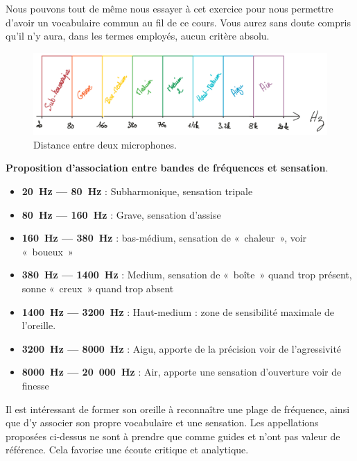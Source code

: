 \documentclass[
]{book}
\providecommand{\tightlist}{%
  \setlength{\itemsep}{0pt}\setlength{\parskip}{0pt}}
\begin{document}
Nous pouvons tout de même nous essayer à cet exercice pour nous permettre d'avoir un vocabulaire commun au fil de ce cours. Vous aurez sans doute compris qu'il n'y aura, dans les termes employés, aucun critère absolu.

\begin{figure}

{\centering \includegraphics[width=1\linewidth]{_resources/drawings/spectre} 

}

\caption{Distance entre deux microphones.}\label{fig:unnamed-chunk-6}
\end{figure}

\textbf{Proposition d'association entre bandes de fréquences et sensation}.

\begin{itemize}
\tightlist
\item
  \textbf{20~Hz --- 80~Hz} : Subharmonique, sensation tripale
\item
  \textbf{80~Hz --- 160~Hz} : Grave, sensation d'assise
\item
  \textbf{160~Hz --- 380~Hz} : bas-médium, sensation de «~chaleur~», voir «~boueux~»
\item
  \textbf{380~Hz --- 1400~Hz} : Medium, sensation de «~boîte~» quand trop présent, sonne «~creux~» quand trop absent
\item
  \textbf{1400~Hz --- 3200~Hz} : Haut-medium : zone de sensibilité maximale de l'oreille.
\item
  \textbf{3200~Hz --- 8000~Hz} : Aigu, apporte de la précision voir de l'agressivité
\item
  \textbf{8000~Hz --- 20~000~Hz} : Air, apporte une sensation d'ouverture voir de finesse
\end{itemize}

Il est intéressant de former son oreille à reconnaître une plage de fréquence, ainsi que d'y associer son propre vocabulaire et une sensation. Les appellations proposées ci-dessus ne sont à prendre que comme guides et n'ont pas valeur de référence. Cela favorise une écoute critique et analytique.
\end{document}
